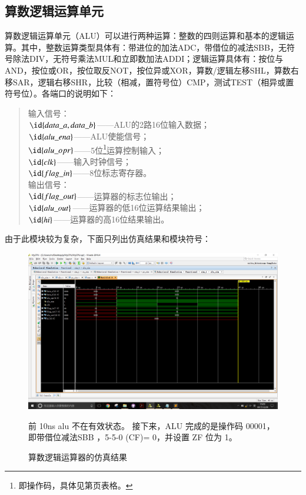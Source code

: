 \documentclass[titlepage, 11pt]{article}
\begin{document}
		\subsection{算数逻辑运算单元}
			算数逻辑运算单元（ALU）可以进行两种运算：整数的四则运算和基本的逻辑运算。其中，整数运算类型具体有：带进位的加法ADC，带借位的减法SBB，无符号除法DIV，无符号乘法MUL和立即数加法ADDI；逻辑运算具体有：按位与AND，按位或OR，按位取反NOT，按位异或XOR，算数/逻辑左移SHL，算数右移SAR，逻辑右移SHR，比较（相减，置符号位）CMP，测试TEST（相异或置符号位）。各端口的说明如下：
			\begin{quote}
				输入信号：\\
				$\id{data\_a,data\_b}$——ALU的2路16位输入数据；\\
				$\id{alu\_ena}$——ALU使能信号；\\
				$\id{alu\_opr}$——5位\footnote{即操作码，具体见第页表格。}运算控制输入；\\
				$\id{clk}$——输入时钟信号；\\
				$\id{flag\_in}$——8位标志寄存器。\\
				输出信号：\\
				$\id{flag\_out}$——运算器的标志位输出；\\
				$\id{alu\_out}$——运算器的低16位运算结果输出；\\
				$\id{hi}$——运算器的高16位结果输出。
			\end{quote}
		由于此模块较为复杂，下面只列出仿真结果和模块符号：
			\begin{figure}[H]
				\centering
				\includegraphics[scale=0.32]{alu.png}
				\caption{算数逻辑运算器的仿真结果}
				前 10ns alu 不在有效状态。
				接下来，ALU 完成的是操作码 00001，即带借位减法SBB ，5-5-0 (CF)= 0，并设置 ZF 位为 1。
			\end{figure}
\end{document}
